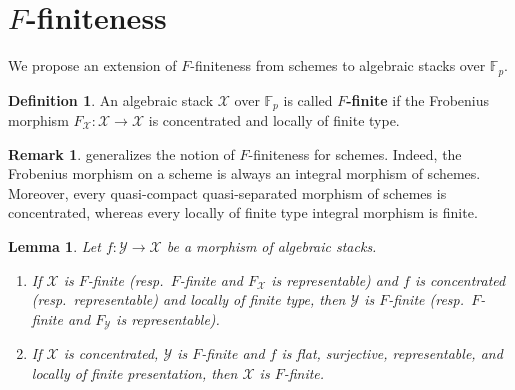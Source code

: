 \documentclass[11pt]{amsart}
\theoremstyle{plain}
\newtheorem{lemma}[theorem]{Lemma}
\theoremstyle{definition}
\newtheorem{definition}[theorem]{Definition}
\newtheorem{remark}[theorem]{Remark}
\numberwithin{equation}{section}
\numberwithin{theorem}{section}
\begin{document}
\section{\texorpdfstring{$F$}{F}-finiteness}
\label{sec:finiteness_F-finiteness}

We propose an extension of $F$-finiteness from schemes to algebraic stacks over $\mathbb{F}_p$.

\begin{definition}
    \label{def:F_finite}
    An algebraic stack $\mathcal{X}$ over $\mathbb{F}_p$ is called \textbf{$F$-finite} if the Frobenius morphism $F_\mathcal{X}\colon \mathcal{X} \to \mathcal{X}$ is concentrated and locally of finite type. 
\end{definition}

\begin{remark}
    \label{rmk:F-finiteness}
     generalizes the notion of $F$-finiteness for schemes. Indeed, the Frobenius morphism on a scheme is always an integral morphism of schemes. 
    Moreover, every quasi-compact quasi-separated morphism of schemes is concentrated, whereas every locally of finite type integral morphism is finite. 
\end{remark}

\begin{lemma}
    \label{lem:F-finiteness_ascent_descent}
    Let $f\colon\mathcal{Y}\to\mathcal{X}$ be a morphism of algebraic stacks.
    \begin{enumerate}
        \item If $\mathcal{X}$ is $F$-finite (resp.\ $F$-finite and $F_\mathcal{X}$ is representable) and $f$ is concentrated (resp.\ representable) and locally of finite type, then $\mathcal{Y}$ is $F$-finite (resp.\ $F$-finite and $F_\mathcal{Y}$ is representable).
        \item If $\mathcal{X}$ is concentrated, $\mathcal{Y}$ is $F$-finite and $f$ is flat, surjective, representable, and locally of finite presentation, then $\mathcal{X}$ is $F$-finite.
    \end{enumerate}
\end{lemma}
\end{document}
